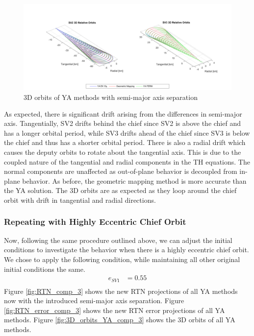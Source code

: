 \begin{figure}[H]
    \centering
    \includegraphics[width=1\linewidth]{sim/figures/PS3/3D_YA_comparison_2.png}
    \caption{3D orbits of YA methods with semi-major axis separation}
    \label{fig:3D_orbits_YA_comp_2}
\end{figure}

As expected, there is significant drift arising from the differences in semi-major axis. Tangentially, SV2 drifts behind the chief since SV2 is above the chief and has a longer orbital period, while SV3 drifts ahead of the chief since SV3 is below the chief and thus has a shorter orbital period. There is also a radial drift which causes the deputy orbits to rotate about the tangential axis. This is due to the coupled nature of the tangential and radial components in the TH equations. The normal components are unaffected as out-of-plane behavior is decoupled from in-plane behavior. As before, the geometric mapping method is more accurate than the YA solution. The 3D orbits are as expected as they loop around the chief orbit with drift in tangential and radial directions.

\subsubsection{Repeating with Highly Eccentric Chief Orbit}
Now, following the same procedure outlined above, we can adjust the initial conditions to investigate the behavior when there is a highly eccentric chief orbit. We chose to apply the following condition, while maintaining all other original initial conditions the same. 
\begin{align*}
e_{SV1} &= 0.55 \\
\end{align*}
Figure \ref{fig:RTN_comp_3} shows the new RTN projections of all YA methods now with the introduced semi-major axis separation. Figure \ref{fig:RTN_error_comp_3} shows the new RTN error projections of all YA methods. Figure \ref{fig:3D_orbits_YA_comp_3} shows the 3D orbits of all YA methods. 

